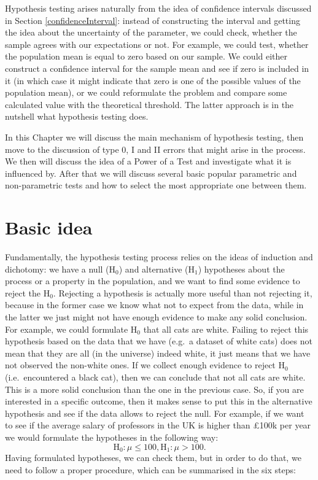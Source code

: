 \documentclass[
]{book}
\theoremstyle{definition}
\theoremstyle{definition}
\theoremstyle{definition}
\theoremstyle{definition}
\theoremstyle{remark}
\begin{document}
Hypothesis testing arises naturally from the idea of confidence intervals discussed in Section \ref{confidenceInterval}: instead of constructing the interval and getting the idea about the uncertainty of the parameter, we could check, whether the sample agrees with our expectations or not. For example, we could test, whether the population mean is equal to zero based on our sample. We could either construct a confidence interval for the sample mean and see if zero is included in it (in which case it might indicate that zero is one of the possible values of the population mean), or we could reformulate the problem and compare some calculated value with the theoretical threshold. The latter approach is in the nutshell what hypothesis testing does.

In this Chapter we will discuss the main mechanism of hypothesis testing, then move to the discussion of type 0, I and II errors that might arise in the process. We then will discuss the idea of a Power of a Test and investigate what it is influenced by. After that we will discuss several basic popular parametric and non-parametric tests and how to select the most appropriate one between them.

\hypertarget{hypothesisTestingBasics}{%
\section{Basic idea}\label{hypothesisTestingBasics}}

Fundamentally, the hypothesis testing process relies on the ideas of induction and dichotomy: we have a null (\(\mathrm{H}_0\)) and alternative (\(\mathrm{H}_1\)) hypotheses about the process or a property in the population, and we want to find some evidence to reject the \(\mathrm{H}_0\). Rejecting a hypothesis is actually more useful than not rejecting it, because in the former case we know what not to expect from the data, while in the latter we just might not have enough evidence to make any solid conclusion. For example, we could formulate \(\mathrm{H}_0\) that all cats are white. Failing to reject this hypothesis based on the data that we have (e.g.~a dataset of white cats) does not mean that they are all (in the universe) indeed white, it just means that we have not observed the non-white ones. If we collect enough evidence to reject \(\mathrm{H}_0\) (i.e.~encountered a black cat), then we can conclude that not all cats are white. This is a more solid conclusion than the one in the previous case. So, if you are interested in a specific outcome, then it makes sense to put this in the alternative hypothesis and see if the data allows to reject the null. For example, if we want to see if the average salary of professors in the UK is higher than £100k per year we would formulate the hypotheses in the following way:
\begin{equation*}
    \mathrm{H}_0: \mu \leq 100, \mathrm{H}_1: \mu > 100.
\end{equation*}
Having formulated hypotheses, we can check them, but in order to do that, we need to follow a proper procedure, which can be summarised in the six steps:
\end{document}
